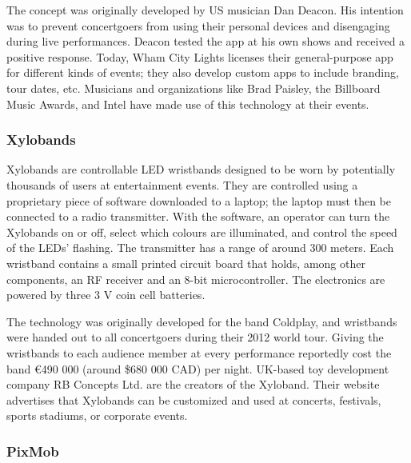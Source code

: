 The concept was originally developed by US musician Dan Deacon. His intention was to prevent concertgoers from using their personal devices and disengaging during live performances. Deacon tested the app at his own shows and received a positive response. Today, Wham City Lights licenses their general-purpose app for different kinds of events; they also develop custom apps to include branding, tour dates, etc. Musicians and organizations like Brad Paisley, the Billboard Music Awards, and Intel have made use of this technology at their events.

\subsubsection{Xylobands}

Xylobands are controllable LED wristbands designed to be worn by potentially thousands of users at entertainment events. They are controlled using a proprietary piece of software downloaded to a laptop; the laptop must then be connected to a radio transmitter. With the software, an operator can turn the Xylobands on or off, select which colours are illuminated, and control the speed of the LEDs' flashing. The transmitter has a range of around 300 meters. Each wristband contains a small printed circuit board that holds, among other components, an RF receiver and an 8-bit microcontroller. The electronics are powered by three 3 V coin cell batteries.

The technology was originally developed for the band Coldplay, and wristbands were handed out to all concertgoers during their 2012 world tour. Giving the wristbands to each audience member at every performance reportedly cost the band \euro{}490 000 (around \$680 000 CAD) per night. UK-based toy development company RB Concepts Ltd. are the creators of the Xyloband. Their website advertises that Xylobands can be customized and used at concerts, festivals, sports stadiums, or corporate events.

\subsubsection{PixMob}


